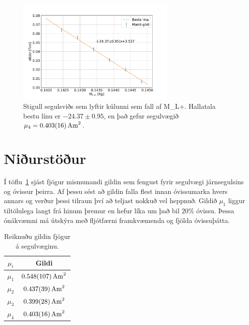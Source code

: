 \documentclass[11pt]{article}
\begin{document}
\begin{figure}[H]
    \centering
    \includegraphics[width=0.7\textwidth]{Hluti_4.PDF}
    \caption{Stigull segulsviðs sem lyftir kúlunni sem fall af M_{L+}. Hallatala bestu línu er $-24.37 \pm 0.95$, en það gefur segulvægið $\mu_4 = \SI{0.403 \pm 0.016}{A m^2}$.}
    \label{fig:hluti 4}
\end{figure}
 
 
 
\section{Niðurstöður}

Í töflu~\ref{tab:samanburdur} sjást fjögur mismunandi gildin sem fengust fyrir segulvægi járnsegulsins og óvissur þeirra. Af þessu sést að gildin falla flest innan óvissumarka hvers annars og verður þessi tilraun því að teljast nokkuð vel heppnuð. Gildið $\mu_1$ liggur tiltölulega langt frá hinum þremur en hefur líka um það bil $20\%$ óvissu. Þessa ónákvæmni má útskýra með fljótfærni framkvæmenda og fjölda óvissuþátta.

\begin{table}[H]
    \centering
    \caption{Reiknuðu gildin fjögur á segulvæginu.}
    \begin{tabular}{|c|c|}
    \hline
    $\mu_i$     & Gildi\\
    \hline
    $\mu_1$     & $\SI{0.548 \pm 0.107}{A m^2}$  \\
    $\mu_2$     & $\SI{0.437 \pm 0.039}{A m^2}$  \\
    $\mu_3$     & $\SI{0.399 \pm 0.028}{A m^2}$ \\
    $\mu_4$     & $\SI{0.403 \pm 0.016}{A m^2}$  \\
    \hline
    \end{tabular}
    \label{tab:samanburdur}
\end{table}
\end{document}
